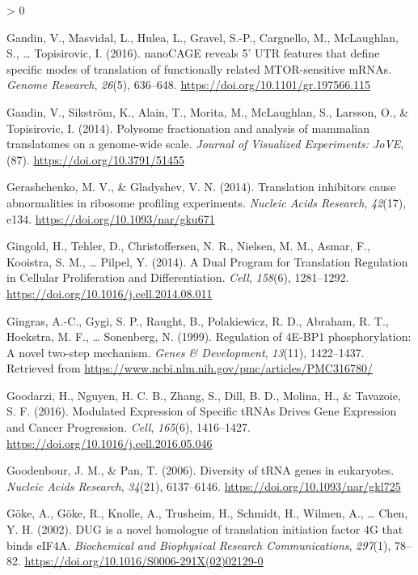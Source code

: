 \documentclass[
  12pt,
  openany]{book}
\newlength{\cslhangindent}
\newenvironment{CSLReferences}[2] %
 {%
  \setlength{\parindent}{0pt}
  \ifodd #1 \everypar{\setlength{\hangindent}{\cslhangindent}}\ignorespaces\fi
  \ifnum #2 > 0
  \setlength{\parskip}{#2\baselineskip}
  \fi
 }%
 {}
\begin{document}
\begin{CSLReferences}{1}{0}
\leavevmode\hypertarget{ref-Gandin2016a}{}%
Gandin, V., Masvidal, L., Hulea, L., Gravel, S.-P., Cargnello, M., McLaughlan, S., \ldots{} Topisirovic, I. (2016). {nanoCAGE} reveals 5' {UTR} features that define specific modes of translation of functionally related {MTOR}-sensitive {mRNAs}. \emph{Genome Research}, \emph{26}(5), 636--648. \url{https://doi.org/10.1101/gr.197566.115}

\leavevmode\hypertarget{ref-Gandin2014}{}%
Gandin, V., Sikström, K., Alain, T., Morita, M., McLaughlan, S., Larsson, O., \& Topisirovic, I. (2014). Polysome fractionation and analysis of mammalian translatomes on a genome-wide scale. \emph{Journal of Visualized Experiments: JoVE}, (87). \url{https://doi.org/10.3791/51455}

\leavevmode\hypertarget{ref-Gerashchenko2014}{}%
Gerashchenko, M. V., \& Gladyshev, V. N. (2014). Translation inhibitors cause abnormalities in ribosome profiling experiments. \emph{Nucleic Acids Research}, \emph{42}(17), e134. \url{https://doi.org/10.1093/nar/gku671}

\leavevmode\hypertarget{ref-Gingold2014}{}%
Gingold, H., Tehler, D., Christoffersen, N. R., Nielsen, M. M., Asmar, F., Kooistra, S. M., \ldots{} Pilpel, Y. (2014). A {Dual Program} for {Translation Regulation} in {Cellular Proliferation} and {Differentiation}. \emph{Cell}, \emph{158}(6), 1281--1292. \url{https://doi.org/10.1016/j.cell.2014.08.011}

\leavevmode\hypertarget{ref-Gingras1999}{}%
Gingras, A.-C., Gygi, S. P., Raught, B., Polakiewicz, R. D., Abraham, R. T., Hoekstra, M. F., \ldots{} Sonenberg, N. (1999). Regulation of {4E}-{BP1} phosphorylation: A novel two-step mechanism. \emph{Genes \& Development}, \emph{13}(11), 1422--1437. Retrieved from \url{https://www.ncbi.nlm.nih.gov/pmc/articles/PMC316780/}

\leavevmode\hypertarget{ref-Goodarzi2016}{}%
Goodarzi, H., Nguyen, H. C. B., Zhang, S., Dill, B. D., Molina, H., \& Tavazoie, S. F. (2016). Modulated {Expression} of {Specific tRNAs Drives Gene Expression} and {Cancer Progression}. \emph{Cell}, \emph{165}(6), 1416--1427. \url{https://doi.org/10.1016/j.cell.2016.05.046}

\leavevmode\hypertarget{ref-Goodenbour2006}{}%
Goodenbour, J. M., \& Pan, T. (2006). Diversity of {tRNA} genes in eukaryotes. \emph{Nucleic Acids Research}, \emph{34}(21), 6137--6146. \url{https://doi.org/10.1093/nar/gkl725}

\leavevmode\hypertarget{ref-Goke2002}{}%
Göke, A., Göke, R., Knolle, A., Trusheim, H., Schmidt, H., Wilmen, A., \ldots{} Chen, Y. H. (2002). {DUG} is a novel homologue of translation initiation factor {4G} that binds {eIF4A}. \emph{Biochemical and Biophysical Research Communications}, \emph{297}(1), 78--82. \url{https://doi.org/10.1016/S0006-291X(02)02129-0}


\end{CSLReferences}
\end{document}
